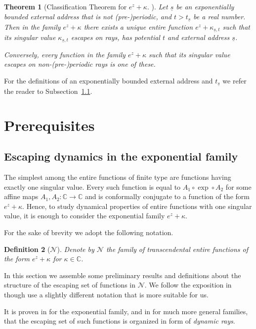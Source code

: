 \documentclass[10pt,reqno,a4paper]{amsart}
\numberwithin{figure}{section}
\numberwithin{equation}{section}
\newtheorem{thm}{Theorem}[section]
\newtheorem{defn}[thm]{Definition}
\begin{document}
\begin{thm}[Classification Theorem for $e^z+\kappa$. \cite{MarkusThesis}]
	\label{thm:main_thm}
	Let $\underline{s}$ be an exponentially bounded external address that is not (pre-)periodic, and $t>t_{\underline{s}}$ be a real number. Then in the family $e^z+\kappa$ there exists a unique entire function $e^z+\kappa_{\underline{s},t}$ such that its singular value $\kappa_{\underline{s},t}$ escapes on rays, has potential $t$ and external address $\underline{s}$.
	
	Conversely, every function in the family $e^z+\kappa$ such that its singular value escapes on non-(pre-)periodic rays is one of these. 
\end{thm}

For the definitions of an exponentially bounded external address and $t_{\underline{s}}$ we refer the reader to Subsection~\ref{subsec:esc_dynamics}.

\section{Prerequisites}

\subsection{Escaping dynamics in the exponential family}
\label{subsec:esc_dynamics}

The simplest among the entire functions of finite type are functions having exactly one singular value. Every such function is equal to $A_1\circ\exp\circ A_2$ for some affine maps $A_1,A_2:\mathbb{C}\to\mathbb{C}$ and is conformally conjugate to a function of the form $e^z+\kappa$. Hence, to study dynamical properties of entire functions with one singular value, it is enough to consider the exponential family $e^z+\kappa$.

For the sake of brevity we adopt the following notation.
\begin{defn}[$\mathcal{N}$]
	Denote by $\mathcal{N}$ the family of transcendental entire functions of the form $e^z+\kappa$ for $\kappa\in\mathbb{C}$.
\end{defn}

In this section we assemble some preliminary results and definitions about the structure of the escaping set of functions in $\mathcal{N}$. We follow the exposition in \cite{SZ-Escaping} though use a slightly different notation that is more suitable for us.

It is proven in \cite{SZ-Escaping} for the exponential family, and in \cite{RRRS} for much more general families, that the escaping set of such functions is organized in form of \emph{dynamic rays}.
\end{document}
